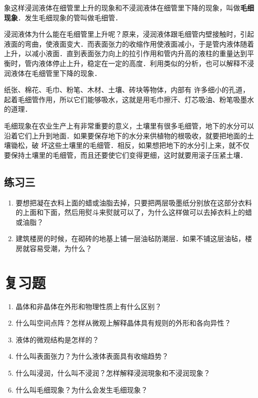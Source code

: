 象这样浸润液体在细管里上升的现象和不浸润液体在细管里下降的现象，叫做\textbf{毛细现象}．发生毛细现象的管叫做毛细管．

浸润液体为什么能在毛细管里上升呢？原来，浸润液体跟毛细管内壁接触时，引起液面的弯曲，使液面变大．而表面张力的收缩作用使液面减小，于是管内液体随着上升，以减小液面．直到表面张力向上的拉引作用和管内升高的液柱的重量达到平衡时，管内液体停止上升，稳定在一定的高度．利用类似的分析，也可以解释不浸润液体在毛细管里下降的现象．

纸张、棉花、毛巾、粉笔、木材、土壤、砖块等物体，内部有
许多细小的孔道，起着毛细管作用，所以它们能够吸水，这就是用毛巾擦汗、灯芯吸油、粉笔吸墨水的道理．

毛细现象在农业生产上有非常重要的意义，土壤里有很多毛细管，地下的水分可以沿着它们上升到地面．如果要保存地下的水分来供植物的根吸收，就要把地面的土壤锄松，破
坏这些土壤里的毛细管．相反，如果想把地下的水分引上来，就不仅要保持土壤里的毛细管，而且还要使它们变得更细，这时就要用滚子压紧土壤．

\subsection*{练习三}
\begin{enumerate}
   \item 要想把凝在衣料上面的蜡或油脂去掉，只要把两层吸墨纸分别放在这部分衣料的上面和下面，然后用熨斗来熨就可以了，为什么这样做可以去掉衣料上的蜡或油脂？
\item 建筑楼房的时候，在砌砖的地基上铺一层油毡防潮层．如果不铺这层油毡，楼房就容易受潮，为什么？
\end{enumerate}

\section*{复习题}

\begin{enumerate}
\item 晶体和非晶体在外形和物理性质上有什么区别？
\item 什么叫空间点阵？怎样从微观上解释晶体具有规则的外形和各向异性？
\item 液体的微观结构是怎样的？
\item 什么叫表面张力？为什么液体表面具有收缩趋势？
\item 什么叫浸润，什么叫不浸润？怎样解释浸润現象和不浸润现象？
\item 什么叫毛细现象？为什么会发生毛细现象？
\end{enumerate}



